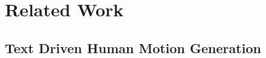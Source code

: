 \section{Related Work}
\label{sec2}

\subsection{Text Driven Human Motion Generation}\label{sec2_1}




